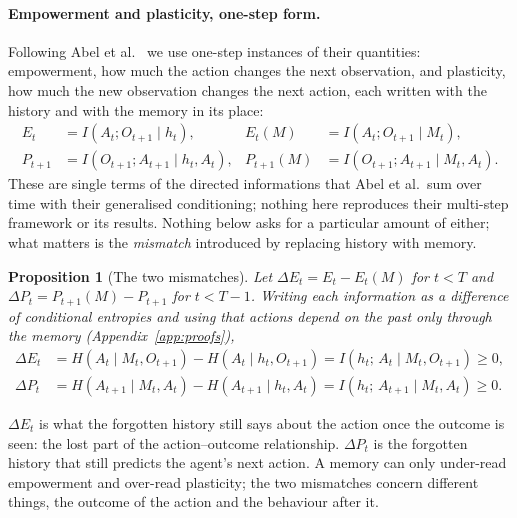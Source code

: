 \documentclass[11pt]{article}
\theoremstyle{plain}
\newtheorem{proposition}[theorem]{Proposition}
\theoremstyle{definition}
\theoremstyle{remark}
\newcommand{\dE}{\Delta E}
\newcommand{\dP}{\Delta P}
\begin{document}
\paragraph{Empowerment and plasticity, one-step form.}
Following Abel et al.\ \cite{abel2025plasticity} we use one-step instances of their quantities: empowerment, how much the action changes the next observation, and plasticity, how much the new observation changes the next action, each written with the history and with the memory in its place:
\begin{align}
E_t &= I(A_t; O_{t+1} \mid h_t), & E_t(M) &= I(A_t; O_{t+1} \mid M_t), \label{eq:emp}\\
P_{t+1} &= I(O_{t+1}; A_{t+1} \mid h_t, A_t), & P_{t+1}(M) &= I(O_{t+1}; A_{t+1} \mid M_t, A_t). \label{eq:pla}
\end{align}
These are single terms of the directed informations that Abel et al.\ sum over time with their generalised conditioning; nothing here reproduces their multi-step framework or its results. Nothing below asks for a particular amount of either; what matters is the \emph{mismatch} introduced by replacing history with memory.
\begin{proposition}[The two mismatches]\label{prop:mismatch}
Let $\dE_t = E_t - E_t(M)$ for $t < T$ and $\dP_t = P_{t+1}(M) - P_{t+1}$ for $t < T - 1$. Writing each information as a difference of conditional entropies and using that actions depend on the past only through the memory (Appendix~\ref{app:proofs}),
\begin{align*}
\dE_t &= H(A_t \mid M_t, O_{t+1}) - H(A_t \mid h_t, O_{t+1}) = I(h_t;\, A_t \mid M_t, O_{t+1}) \ge 0, \\
\dP_t &= H(A_{t+1} \mid M_t, A_t) - H(A_{t+1} \mid h_t, A_t) = I(h_t;\, A_{t+1} \mid M_t, A_t) \ge 0 .
\end{align*}
\end{proposition}
$\dE_t$ is what the forgotten history still says about the action once the outcome is seen: the lost part of the action--outcome relationship. $\dP_t$ is the forgotten history that still predicts the agent's next action. A memory can only under-read empowerment and over-read plasticity; the two mismatches concern different things, the outcome of the action and the behaviour after it.
\end{document}
